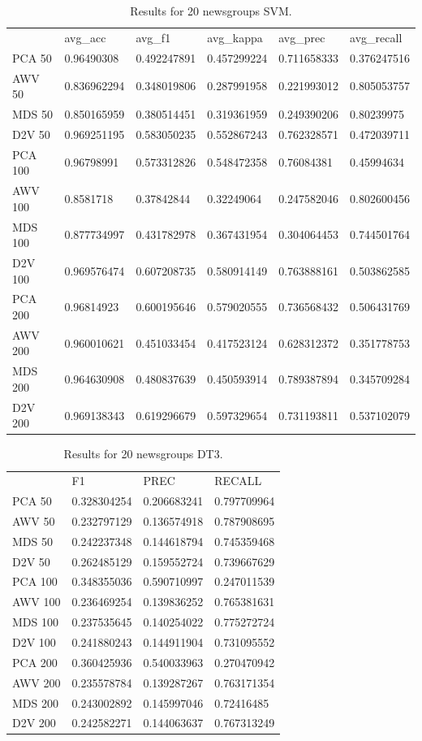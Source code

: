 \begin{table}[]
\begin{tabular}{llllll}
	& avg\_acc    & avg\_f1     & avg\_kappa  & avg\_prec   & avg\_recall \\
	PCA 50  & 0.96490308  & 0.492247891 & 0.457299224 & 0.711658333 & 0.376247516 \\
	AWV 50  & 0.836962294 & 0.348019806 & 0.287991958 & 0.221993012 & 0.805053757 \\
	MDS 50  & 0.850165959 & 0.380514451 & 0.319361959 & 0.249390206 & 0.80239975  \\
	D2V 50  & 0.969251195 & 0.583050235 & 0.552867243 & 0.762328571 & 0.472039711 \\
	PCA 100 & 0.96798991  & 0.573312826 & 0.548472358 & 0.76084381  & 0.45994634  \\
	AWV 100 & 0.8581718   & 0.37842844  & 0.32249064  & 0.247582046 & 0.802600456 \\
	MDS 100 & 0.877734997 & 0.431782978 & 0.367431954 & 0.304064453 & 0.744501764 \\
	D2V 100 & 0.969576474 & 0.607208735 & 0.580914149 & 0.763888161 & 0.503862585 \\
	PCA 200 & 0.96814923  & 0.600195646 & 0.579020555 & 0.736568432 & 0.506431769 \\
	AWV 200 & 0.960010621 & 0.451033454 & 0.417523124 & 0.628312372 & 0.351778753 \\
	MDS 200 & 0.964630908 & 0.480837639 & 0.450593914 & 0.789387894 & 0.345709284 \\
	D2V 200 & 0.969138343 & 0.619296679 & 0.597329654 & 0.731193811 & 0.537102079
\end{tabular}
	\caption{Results for 20 newsgroups SVM.}
	\label{table:Newsgroups}
\end{table}

\begin{table}[]
	\begin{tabular}{llll}
		& F1          & PREC        & RECALL      \\
		PCA 50  & 0.328304254 & 0.206683241 & 0.797709964 \\
		AWV 50  & 0.232797129 & 0.136574918 & 0.787908695 \\
		MDS 50  & 0.242237348 & 0.144618794 & 0.745359468 \\
		D2V 50  & 0.262485129 & 0.159552724 & 0.739667629 \\
		PCA 100 & 0.348355036 & 0.590710997 & 0.247011539 \\
		AWV 100 & 0.236469254 & 0.139836252 & 0.765381631 \\
		MDS 100 & 0.237535645 & 0.140254022 & 0.775272724 \\
		D2V 100 & 0.241880243 & 0.144911904 & 0.731095552 \\
		PCA 200 & 0.360425936 & 0.540033963 & 0.270470942 \\
		AWV 200 & 0.235578784 & 0.139287267 & 0.763171354 \\
		MDS 200 & 0.243002892 & 0.145997046 & 0.72416485  \\
		D2V 200 & 0.242582271 & 0.144063637 & 0.767313249
	\end{tabular}
	\caption{Results for 20 newsgroups DT3.}
	\label{table:Newsgroups}
\end{table}

